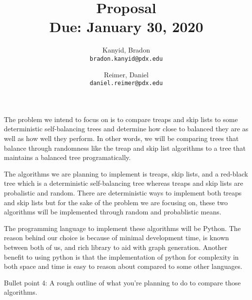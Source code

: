 \documentclass[11pt]{article}
\title{\bf Proposal \\[2ex]
\rm\normalsize Due: January 30, 2020}
\date{}
\author{
  Kanyid, Bradon\\
  \texttt{bradon.kanyid@pdx.edu}
  \and
  Reimer, Daniel\\
  \texttt{daniel.reimer@pdx.edu}
}
\begin{document}
\maketitle


The problem we intend to focus on is to compare treaps and skip lists to some deterministic self-balancing trees and determine how close to balanced they are as well as how well they perform. In other words, we will be comparing trees that balance through randomness like the treap and skip list algorithms to a tree that maintains a balanced tree programatically.

The algorithms we are planning to implement is treaps, skip lists, and a red-black tree which is a deterministic self-balancing tree whereas treaps and skip lists are probalistic and random. There are deterministic ways to implement both treaps and skip lists but for the sake of the problem we are focusing on, these two algorithms will be implemented through random and probablistic means.

The programming language to implement these algorithms will be Python. The reason behind our choice is because of minimal development time, is known between both of us, and rich library to aid with graph generation. Another benefit to using python is that the implementation of python for complexity in both space and time is easy to reason about compared to some other languages.

Bullet point 4: A rough outline of what you’re planning to do to compare those algorithms.
\end{document}
